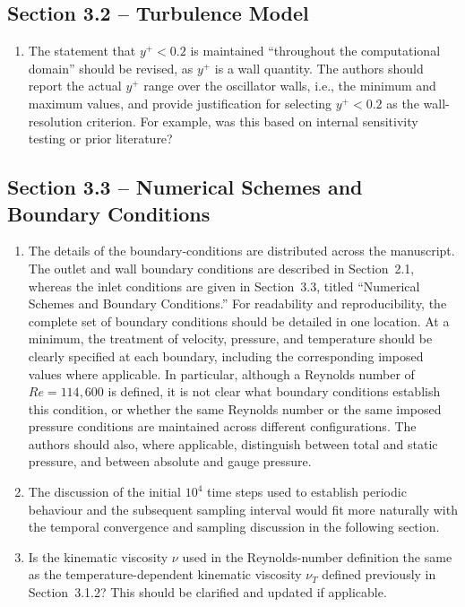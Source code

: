 \documentclass[11pt]{article}
\begin{document}
	
	\subsection*{Section 3.2 -- Turbulence Model}
	
	\begin{enumerate}
		\item The statement that $y^+<0.2$ is maintained ``throughout the computational domain'' should be revised, as $y^+$ is a wall quantity. The authors should report the actual $y^+$ range over the oscillator walls, i.e., the minimum and maximum values, and provide justification for selecting $y^+<0.2$ as the wall-resolution criterion. For example, was this based on internal sensitivity testing or prior literature?
	\end{enumerate}
	
	
	\subsection*{Section 3.3 -- Numerical Schemes and Boundary Conditions}
	
	\begin{enumerate}
		\item The details of the boundary-conditions are distributed across the manuscript. The outlet and wall boundary conditions are described in Section~2.1, whereas the inlet conditions are given in Section~3.3, titled ``Numerical Schemes and Boundary Conditions.'' For readability and reproducibility, the complete set of boundary conditions should be detailed in one location. At a minimum, the treatment of velocity, pressure, and temperature should be clearly specified at each boundary, including the corresponding imposed values where applicable. In particular, although a Reynolds number of $Re=114{,}600$ is defined, it is not clear what boundary conditions establish this condition, or whether the same Reynolds number or the same imposed pressure conditions are maintained across different configurations. The authors should also, where applicable, distinguish between total and static pressure, and between absolute and gauge pressure. 
		\item The discussion of the initial $10^4$ time steps used to establish periodic behaviour and the subsequent sampling interval would fit more naturally with the temporal convergence and sampling discussion in the following section.
		\item Is the kinematic viscosity $\nu$ used in the Reynolds-number definition the same as the temperature-dependent kinematic viscosity $\nu_T$ defined previously in Section~3.1.2? This should be clarified and updated if applicable.
	\end{enumerate}
	
\end{document}
